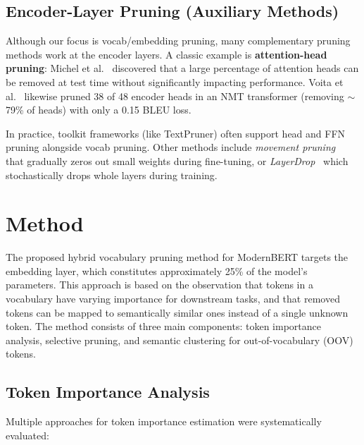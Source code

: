 \documentclass[twocolumn]{article}
\begin{document}
\subsection{Encoder-Layer Pruning (Auxiliary Methods)}

Although our focus is vocab/embedding pruning, many complementary pruning methods work at the encoder layers. A classic example is \textbf{attention-head pruning}: Michel et al.~\cite{michel2019sixteen} discovered that a large percentage of attention heads can be removed at test time without significantly impacting performance. Voita et al.~\cite{voita2019analyzing} likewise pruned 38 of 48 encoder heads in an NMT transformer (removing $\sim$79\% of heads) with only a 0.15 BLEU loss.

In practice, toolkit frameworks (like TextPruner) often support head and FFN pruning alongside vocab pruning. Other methods include \textit{movement pruning}~\cite{sanh2020movement} that gradually zeros out small weights during fine-tuning, or \textit{LayerDrop}~\cite{fan2020layerdrop} which stochastically drops whole layers during training.

\section{Method}

The proposed hybrid vocabulary pruning method for ModernBERT targets the embedding layer, which constitutes approximately 25\% of the model's parameters. This approach is based on the observation that tokens in a vocabulary have varying importance for downstream tasks, and that removed tokens can be mapped to semantically similar ones instead of a single unknown token. The method consists of three main components: token importance analysis, selective pruning, and semantic clustering for out-of-vocabulary (OOV) tokens.

\subsection{Token Importance Analysis}
Multiple approaches for token importance estimation were systematically evaluated:
\end{document}

